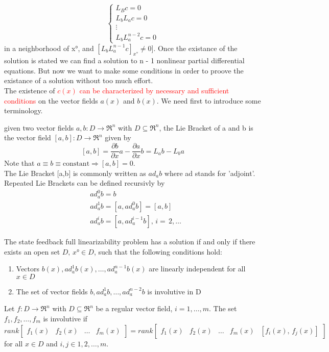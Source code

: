  	 \begin{equation*}
	\left\{
	\begin{array}{ll}	
		L_Bc=0\\
		L_bL_ac=0\\
		\vdots\\
		L_bL_a^{n-2}c=0
	\end{array}
	\right.
\end{equation*} in a neighborhood of x°, and $[L_bL_a^{n-1}c]_{x°}\neq0]$. Once the existance of the solution is stated we can find a solution to n - 1 nonlinear partial differential equations. But now we want to make some conditions in order to proove the existance of a solution without too much effort.\\
The existence of \textcolor{red}{$c(x)$ can be characterized by necessary and sufficient conditions} on the vector fields $a(x)$ and $b(x)$.
We need first to introduce some terminology.\\
\begin{defn}
	given two vector fields $a,b:D\to\Re^n$ with $D\subseteq\Re^n$, the Lie Bracket of a and b is the vector field $[a,b]:D\to\Re^n$ given by \[
	[a,b]=\frac{\partial b}{\partial x}a-\frac{\partial a }{\partial x}b=L_ab-L_ba
	\]Note that $a\equiv b\equiv\text{constant}\Rightarrow[a,b]=0$.\\The Lie Bracket [a,b] is commonly written as $ad_ab$ where ad stands for 'adjoint'. Repeated Lie Brackets can be defined recursivly by
	\[
	\begin{aligned}
		&ad_a^0b=b\\
		&ad_a^1b=[a,ad_a^0b]=[a,b]\\
		&ad_a^ib=[a,ad_a^{i-1}b],\, i=\,2,\dots
	\end{aligned}
	\]
\end{defn}
\begin{thm}
	The state feedback full linearizability problem has a solution if and only if there exists an open set $D, \, x°\in D$, such that the following conditions hold:
	\begin{enumerate}
		\item Vectors ${b(x),ad_a^1b(x),\dots,ad_a^{n-1}b(x)}$ are linearly independent for all $x\in D$
		\item The set of vector fields ${b,ad_a^1b,\dots,ad_a^{n-2}b}$ is involutive in D
	\end{enumerate}
\end{thm}
\begin{defn}
	Let $f:D\to\Re^n$ with $D\subseteq\Re^n$ be a regular vector field, $i=1,\dots,m$. The set ${f_1,f_2,\dots,f_m}$ is involutive if \[
	rank\begin{bmatrix}
		f_1(x) & f_2(x) & \dots & f_m(x)
	\end{bmatrix}=rank\begin{bmatrix}
	f_1(x) & f_2(x) & \dots & f_m(x) & [f_i(x),\, f_j(x)]
\end{bmatrix}
	\]
	for all $x\in D$ and $i,j \in {1,2,\dots,m}$.
\end{defn}
